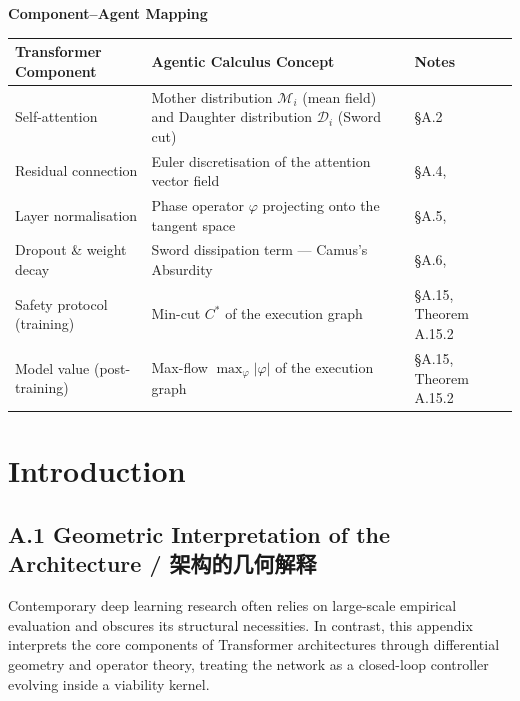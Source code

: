 \documentclass[11pt,a4paper]{article}
\theoremstyle{definition}
\theoremstyle{remark}
\begin{document}
\noindent\textbf{Component--Agent Mapping}

\begin{table}[H]
\centering
\small
\begin{tabularx}{\textwidth}{>{\raggedright\arraybackslash}p{3.8cm} X >{\raggedright\arraybackslash}p{3.5cm}}
\toprule
\textbf{Transformer Component} & \textbf{Agentic Calculus Concept} & \textbf{Notes} \\
\midrule
Self-attention & Mother distribution $\mathcal{M}_i$ (mean field) and Daughter distribution $\mathcal{D}_i$ (Sword cut) & \S A.2 \\
Residual connection & Euler discretisation of the attention vector field & \S A.4, \cite{he2016} \\
Layer normalisation & Phase operator $\varphi$ projecting onto the tangent space & \S A.5, \cite{ba2016} \\
Dropout \& weight decay & Sword dissipation term --- Camus's Absurdity & \S A.6, \cite{srivastava2014,zhang2021} \\
Safety protocol (training) & Min-cut $C^*$ of the execution graph & \S A.15, Theorem A.15.2 \\
Model value (post-training) & Max-flow $\max_\varphi |\varphi|$ of the execution graph & \S A.15, Theorem A.15.2 \\
\bottomrule
\end{tabularx}
\end{table}


\section{Introduction}

\subsection*{A.1 Geometric Interpretation of the Architecture / 架构的几何解释}

Contemporary deep learning research often relies on large-scale empirical evaluation and obscures its structural necessities. In contrast, this appendix interprets the core components of Transformer architectures through differential geometry and operator theory, treating the network as a closed-loop controller evolving inside a viability kernel.
\end{document}
